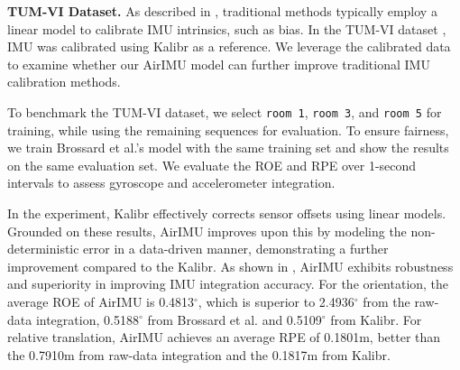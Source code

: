 \textbf{TUM-VI Dataset.}
As described in , traditional methods typically employ a linear model to calibrate IMU intrinsics, such as bias. In the TUM-VI dataset \cite{schubert2018tum}, IMU was calibrated using Kalibr \cite{rehder2016extending} as a reference.
We leverage the calibrated data to examine whether our AirIMU model can further improve traditional IMU calibration methods.

To benchmark the TUM-VI dataset, we select \texttt{room 1}, \texttt{room 3}, and \texttt{room 5} for training, while using the remaining sequences for evaluation. 
To ensure fairness, we train Brossard et al.'s model with the same training set and show the results on the same evaluation set.
We evaluate the ROE and RPE over 1-second intervals to assess gyroscope and accelerometer integration. 

\begin{table}[!t]
    \normalsize
    \caption{The ROE (Unit: \si{\degree}) and RPE (Unit: meter) of IMU Pre-integration over 1 second (200 frames) on the TUMVI dataset.}
    \label{Tab: TUM-Kalibr}
    \centering
\end{table}

In the experiment, Kalibr effectively corrects sensor offsets using linear models.
Grounded on these results, AirIMU improves upon this by modeling the non-deterministic error in a data-driven manner, demonstrating a further improvement compared to the Kalibr. 
As shown in , AirIMU exhibits robustness and superiority in improving IMU integration accuracy. 
For the orientation, the average ROE of AirIMU is 0.4813$^{\circ}$, which is superior to 2.4936$^{\circ}$ from the raw-data integration, 0.5188$^{\circ}$ from Brossard et al. and 0.5109$^{\circ}$ from Kalibr. 
For relative translation, AirIMU achieves an average RPE of 0.1801\si{\meter}, better than the 0.7910\si{\meter} from raw-data integration and the 0.1817\si{\meter} from Kalibr.

